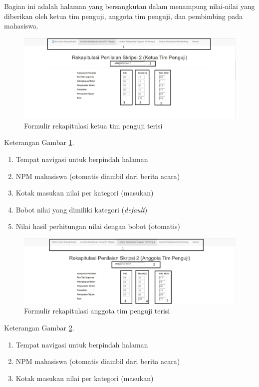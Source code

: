 \begin{itemize}
		Bagian ini adalah halaman yang bersangkutan dalam menampung nilai-nilai yang diberikan oleh ketua tim penguji, anggota tim penguji, dan pembimbing pada mahasiswa. 
		\begin{figure}[H]
			\centering
			\includegraphics[scale=0.4]{Gambar/ketuaisi}
			\caption{Formulir rekapitulasi ketua tim penguji terisi}
			\label{fig:ketuaisi}
		\end{figure}
	Keterangan Gambar \ref{fig:ketuaisi}.
	\begin{enumerate}
		\item Tempat navigasi untuk berpindah halaman
		\item NPM mahasiswa (otomatis diambil dari berita acara)
		\item Kotak masukan nilai per kategori (masukan)
		\item Bobot nilai yang dimiliki kategori (\textit{default})
		\item Nilai hasil perhitungan nilai dengan bobot (otomatis)
	\end{enumerate}
		\begin{figure}[H]
			\centering
			\includegraphics[scale=0.4]{Gambar/anggotaisi}
			\caption{Formulir rekapitulasi anggota tim penguji terisi}
			\label{fig:anggotaisi}
		\end{figure}
	Keterangan Gambar \ref{fig:anggotaisi}.
	\begin{enumerate}
		\item Tempat navigasi untuk berpindah halaman
		\item NPM mahasiswa (otomatis diambil dari berita acara)
		\item Kotak masukan nilai per kategori (masukan)

\end{enumerate}
\end{itemize}
